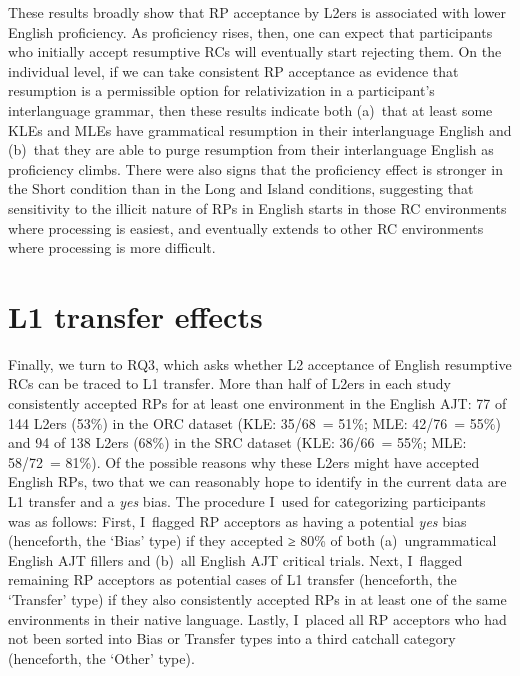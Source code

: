 These results broadly show that RP acceptance by L2ers is associated with lower English proficiency. As proficiency rises, then, one can expect that participants who initially accept resumptive RCs will eventually start rejecting them. On the individual level, if we can take consistent RP acceptance as evidence that resumption is a permissible option for relativization in a participant's interlanguage grammar, then these results indicate both (a)~that at least some KLEs and MLEs have grammatical resumption in their interlanguage English and (b)~that they are able to purge resumption from their interlanguage English as proficiency climbs. There were also signs that the proficiency effect is stronger in the Short condition than in the Long and Island conditions, suggesting that sensitivity to the illicit nature of RPs in English starts in those RC environments where processing is easiest, and eventually extends to other RC environments where processing is more difficult.

\section{L1 transfer effects}\label{ajt-transfer}

Finally, we turn to RQ3, which asks whether L2 acceptance of English resumptive RCs can be traced to L1 transfer.
More than half of L2ers in each study consistently accepted RPs for at least one environment in the English AJT: 77 of 144 L2ers (53\%) in the ORC dataset (KLE: 35/68~= 51\%; MLE: 42/76~= 55\%) and 94 of 138 L2ers (68\%) in the SRC dataset (KLE: 36/66~= 55\%; MLE: 58/72~= 81\%). Of the possible reasons why these L2ers might have accepted English RPs, two that we can reasonably hope to identify in the current data are L1 transfer and a \textit{yes} bias. The procedure I~used for categorizing participants was as follows: First, I~flagged RP acceptors as having a potential \textit{yes} bias (henceforth, the `Bias' type) if they accepted ≥ 80\% of both (a)~ungrammatical English AJT fillers and (b)~all English AJT critical trials. Next, I~flagged remaining RP acceptors as potential cases of L1 transfer (henceforth, the `Transfer' type) if they also consistently accepted RPs in at least one of the same environments in their native language. Lastly, I~placed all RP acceptors who had not been sorted into Bias or Transfer types into a third catchall category (henceforth, the `Other' type).

